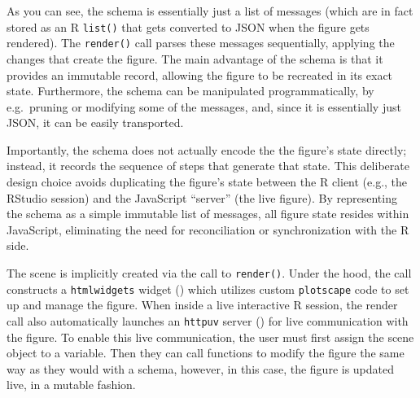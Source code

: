 \documentclass[
]{book}
\theoremstyle{definition}
\theoremstyle{definition}
\theoremstyle{definition}
\theoremstyle{definition}
\theoremstyle{remark}
\begin{document}
As you can see, the schema is essentially just a list of messages (which are in fact stored as an R \texttt{list()} that gets converted to JSON when the figure gets rendered). The \texttt{render()} call parses these messages sequentially, applying the changes that create the figure. The main advantage of the schema is that it provides an immutable record, allowing the figure to be recreated in its exact state. Furthermore, the schema can be manipulated programmatically, by e.g.~pruning or modifying some of the messages, and, since it is essentially just JSON, it can be easily transported.

Importantly, the schema does not actually encode the the figure's state directly; instead, it records the sequence of steps that generate that state. This deliberate design choice avoids duplicating the figure's state between the R client (e.g., the RStudio session) and the JavaScript ``server'' (the live figure). By representing the schema as a simple immutable list of messages, all figure state resides within JavaScript, eliminating the need for reconciliation or synchronization with the R side.

The scene is implicitly created via the call to \texttt{render()}. Under the hood, the call constructs a \texttt{htmlwidgets} widget () which utilizes custom \texttt{plotscape} code to set up and manage the figure. When inside a live interactive R session, the render call also automatically launches an \texttt{httpuv} server () for live communication with the figure. To enable this live communication, the user must first assign the scene object to a variable. Then they can call functions to modify the figure the same way as they would with a schema, however, in this case, the figure is updated live, in a mutable fashion.
\end{document}
